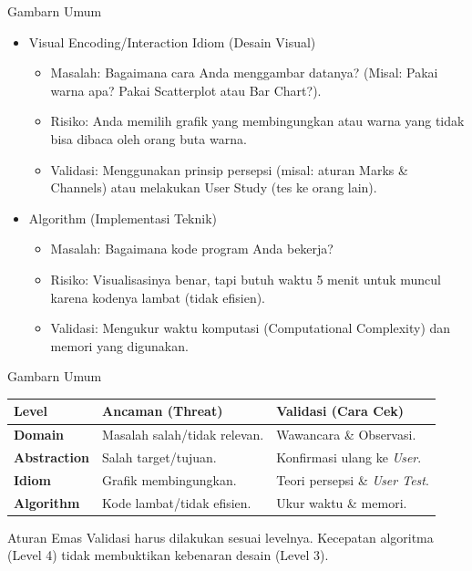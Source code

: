 \documentclass[t]{beamer}
\begin{document}

\begin{frame}{Gambarn Umum}		
	\begin{itemize}
	\item Visual Encoding/Interaction Idiom (Desain Visual)
		\begin{itemize}
			\item Masalah: Bagaimana cara Anda menggambar datanya? (Misal: Pakai warna apa? Pakai Scatterplot atau Bar Chart?).
			\item Risiko: Anda memilih grafik yang membingungkan atau warna yang tidak bisa dibaca oleh orang buta warna.
			\item Validasi: Menggunakan prinsip persepsi (misal: aturan Marks \& Channels) atau melakukan User Study (tes ke orang lain).
		\end{itemize}
	\item Algorithm (Implementasi Teknik)
	\begin{itemize}
		\item Masalah: Bagaimana kode program Anda bekerja?
		\item Risiko: Visualisasinya benar, tapi butuh waktu 5 menit untuk muncul karena kodenya lambat (tidak efisien).
		\item Validasi: Mengukur waktu komputasi (Computational Complexity) dan memori yang digunakan.
	\end{itemize}
	\end{itemize}
\end{frame}


\begin{frame}{Gambarn Umum}
    \centering
    \small
    \begin{tabular}{lp{4cm}p{4cm}}
        \toprule
        \textbf{Level} & \textbf{Ancaman (Threat)} & \textbf{Validasi (Cara Cek)} \\ 
        \midrule
        \textbf{Domain} & Masalah salah/tidak relevan. & Wawancara \& Observasi. \\ \addlinespace
        \textbf{Abstraction} & Salah target/tujuan. & Konfirmasi ulang ke \textit{User}. \\ \addlinespace
        \textbf{Idiom} & Grafik membingungkan. & Teori persepsi \& \textit{User Test}. \\ \addlinespace
        \textbf{Algorithm} & Kode lambat/tidak efisien. & Ukur waktu \& memori. \\ 
        \bottomrule
    \end{tabular}
    
    \vspace{0.4cm}
    \begin{alertblock}{Aturan Emas}
        Validasi harus dilakukan sesuai levelnya. Kecepatan algoritma (Level 4) tidak membuktikan kebenaran desain (Level 3).
    \end{alertblock}
\end{frame}
\end{document}
